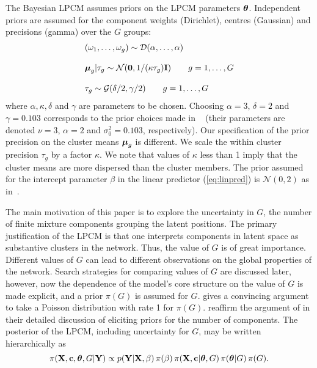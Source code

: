 \documentclass[12pt]{article}
\newcommand{\bX}{{\mathbf{X}}}
\newcommand{\Y}{{\mathbf{Y}}}
\newcommand{\bc}{{\mathbf{c}}}
\newcommand{\I}{{\mathbf{I}}}
\newcommand{\bftheta}{\hbox{\boldmath$\theta$}}
\newcommand{\bfmu}{\hbox{\boldmath$\mu$}}
\begin{document}
The Bayesian LPCM assumes priors on the LPCM parameters $\bftheta$. Independent priors are assumed for the component weights (Dirichlet), centres (Gaussian) and precisions (gamma) over the $G$ groups:
\[
\begin{array}{l}
(\omega_1,\dots,\omega_g) \sim  \mathcal{D}( \alpha, \dots,\alpha)\\
\\
\bfmu_g |\tau_g \sim  \mathcal{N}(\mathbf{0},  1/(\kappa \tau_g) \I) \qquad g=1,\dots, G \\
\\
\tau_g  \sim \mathcal{G} ( \delta/2 , \gamma/2 )\qquad g=1,\dots,G
\end{array}
\]
where $\alpha, \kappa, \delta$ and $\gamma$ are parameters to be chosen.     Choosing $\alpha=3$, $\delta = 2$ and $\gamma = 0.103$  corresponds to the prior choices made in ~ 
(their parameters are denoted $\nu=3$, $\alpha=2$ and $\sigma_0^2=0.103$, respectively). Our specification of the prior precision on the cluster means $\bfmu_g$ is different. We scale the within cluster precision $\tau_g$ by a factor $\kappa$. We note that values of $\kappa$ less than 1 imply that the cluster means are more dispersed than the cluster members. The prior assumed for the intercept parameter $\beta$ in the linear predictor (\ref{eq:linpred}) is $\mathcal{N}(0,2)$ as in~.

The main motivation of this paper is to explore the uncertainty in $G$, the number of finite mixture components grouping the latent positions. The primary justification of the LPCM is that one interprets components in 
latent space as substantive clusters in the network. Thus, the value of $G$ is of great importance. Different values of $G$ can lead to different observations on the global properties of the network. Search strategies 
for comparing values of $G$ are discussed later, however, now the dependence of the model's core structure on the value  of $G$ is made explicit, and a prior $\pi(G)$ is assumed for $G$.  gives a 
convincing argument to take a Poisson distribution with rate 1 for $\pi(G)$.  reaffirm the argument of  in their detailed discussion of eliciting priors for the number of components. 
The posterior of the LPCM, including uncertainty for $G$, may be written hierarchically as 
\begin{equation}
\pi(\bX,\bc,\bftheta,G|\Y) \propto p(\Y|\bX,\beta)\, \pi( \beta ) \, \pi( \bX,\bc | \bftheta,  G )   \, \pi( \bftheta | G )\,  \pi( G ). \label{eq:model}
\end{equation}
\end{document}
